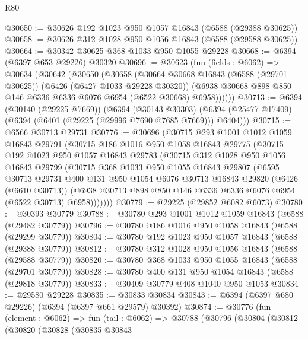 \begin{lexlean}{R80}
\begin{coremodule}
@30650 := @30626 @192 @1023 @950 @1057 @16843 (@6588 (@29388 @30625))
@30658 := @30626 @312 @1028 @950 @1056 @16843 (@6588 (@29588 @30625))
@30664 := @30342 @30625 @368 @1033 @950 @1055 @29228
@30668 := @6394 (@6397 @653 @29226) @30320
@30696 := @30623
    (fun (fields : @6062) =>
    @30634
      (@30642
        (@30650
          (@30658
            (@30664
              @30668
              @16843
              (@6588 (@29701 @30625))
              (@6426 (@6427 @1033 @29228 @30320))
              (@6938 @30668 @898 @850 @146 @6336 @6336 @6076 @6954 (@6522 @30668) @6958))))))
@30713 := @6394
    (@30140 (@29225 @7669))
    (@6394
      (@30143 @30303)
      (@6394 (@25477 @17409) (@6394 (@6401 (@29225 (@29996 @7690 @7685 @7669))) @6404)))
@30715 := @6566 @30713 @29731
@30776 := @30696
    (@30715
      @293
      @1001
      @1012
      @1059
      @16843
      @29791
      (@30715
        @186
        @1016
        @950
        @1058
        @16843
        @29775
        (@30715
          @192
          @1023
          @950
          @1057
          @16843
          @29783
          (@30715
            @312
            @1028
            @950
            @1056
            @16843
            @29799
            (@30715
              @368
              @1033
              @950
              @1055
              @16843
              @29807
              (@6595
                @30713
                @29731
                @400
                @131
                @950
                @1054
                @6076
                @30713
                @16843
                @29820
                (@6426 (@6610 @30713))
                (@6938 @30713 @898 @850 @146 @6336 @6336 @6076 @6954 (@6522 @30713) @6958)))))))
@30779 := @29225 (@29852 @6082 @6073)
@30780 := @30393 @30779
@30788 := @30780 @293 @1001 @1012 @1059 @16843 (@6588 (@29482 @30779))
@30796 := @30780 @186 @1016 @950 @1058 @16843 (@6588 (@29299 @30779))
@30804 := @30780 @192 @1023 @950 @1057 @16843 (@6588 (@29388 @30779))
@30812 := @30780 @312 @1028 @950 @1056 @16843 (@6588 (@29588 @30779))
@30820 := @30780 @368 @1033 @950 @1055 @16843 (@6588 (@29701 @30779))
@30828 := @30780 @400 @131 @950 @1054 @16843 (@6588 (@29818 @30779))
@30833 := @30409 @30779 @408 @1040 @950 @1053
@30834 := @29580 @29228
@30835 := @30833 @30834
@30843 := @6394 (@6397 @680 @29226) (@6394 (@6397 @661 @29579) @30392)
@30874 := @30776
    (fun (element : @6062) =>
    fun (tail : @6062) =>
    @30788
      (@30796
        (@30804
          (@30812
            (@30820
              (@30828
                (@30835
                  @30843

\end{coremodule}
\end{lexlean}
